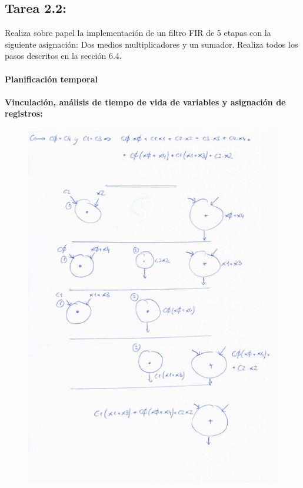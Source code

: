 \documentclass{article}
\begin{document}
\newpage
\subsection{Tarea 2.2:}
Realiza sobre papel la implementación de un filtro FIR de 5 etapas con la siguiente asignación: Dos medios multiplicadores y un sumador. Realiza todos los pasos descritos en la sección 6.4.

\paragraph{ Planificación temporal}



\paragraph{Vinculación, análisis de tiempo de vida de variables y asignación de registros:}

\begin{figure}[H]
\centering
\includegraphics[width=0.85\linewidth]{images/2_2_1.png}
\end{figure}
\end{document}
